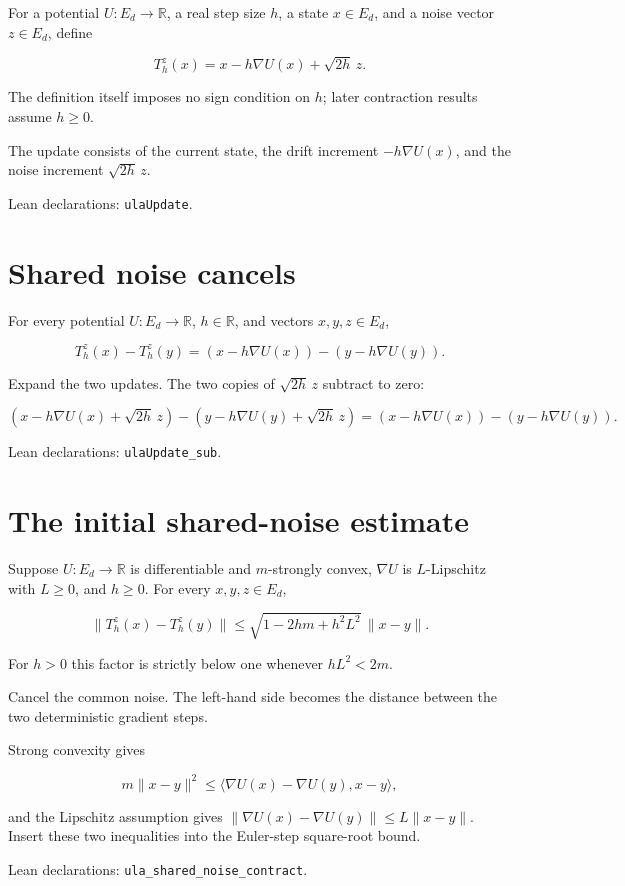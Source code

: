 \documentclass[11pt]{article}
\begin{document}
For a potential \(U:E_d\to\mathbb R\), a real step size \(h\), a state \(x\in E_d\), and a noise vector \(z\in E_d\), define

\[T_h^z(x)=x-h\nabla U(x)+\sqrt{2h}\,z.\]

The definition itself imposes no sign condition on \(h\); later contraction results assume \(h\ge0\).



The update consists of the current state, the drift increment \(-h\nabla U(x)\), and the noise increment \(\sqrt{2h}\,z\).



\noindent Lean declarations: \texttt{ulaUpdate}.

\section{Shared noise cancels}


For every potential \(U:E_d\to\mathbb R\), \(h\in\mathbb R\), and vectors \(x,y,z\in E_d\),

\[T_h^z(x)-T_h^z(y)=(x-h\nabla U(x))-(y-h\nabla U(y)).\]

Expand the two updates. The two copies of \(\sqrt{2h}\,z\) subtract to zero:

\[(x-h\nabla U(x)+\sqrt{2h}\,z)-(y-h\nabla U(y)+\sqrt{2h}\,z)=(x-h\nabla U(x))-(y-h\nabla U(y)).\]

\noindent Lean declarations: \texttt{ulaUpdate\_sub}.

\section{The initial shared-noise estimate}


Suppose \(U:E_d\to\mathbb R\) is differentiable and \(m\)-strongly convex, \(\nabla U\) is \(L\)-Lipschitz with \(L\ge0\), and \(h\ge0\). For every \(x,y,z\in E_d\),

\[\|T_h^z(x)-T_h^z(y)\|\le\sqrt{1-2hm+h^2L^2}\,\|x-y\|.\]

For \(h>0\) this factor is strictly below one whenever \(hL^2<2m\).



Cancel the common noise. The left-hand side becomes the distance between the two deterministic gradient steps.



Strong convexity gives

\[m\|x-y\|^2\le\langle\nabla U(x)-\nabla U(y),x-y\rangle,\]

and the Lipschitz assumption gives \(\|\nabla U(x)-\nabla U(y)\|\le L\|x-y\|\). Insert these two inequalities into the Euler-step square-root bound.



\noindent Lean declarations: \texttt{ula\_shared\_noise\_contract}.
\end{document}
